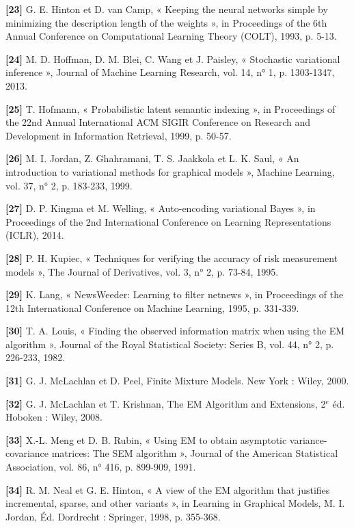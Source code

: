 \textbf{[23]  }G. E. Hinton et D. van Camp, « Keeping the neural networks simple by minimizing the description length of the weights », in Proceedings of the 6th Annual Conference on Computational Learning Theory (COLT), 1993, p. 5-13.

\textbf{[24]  }M. D. Hoffman, D. M. Blei, C. Wang et J. Paisley, « Stochastic variational inference », Journal of Machine Learning Research, vol. 14, n° 1, p. 1303-1347, 2013.

\textbf{[25]  }T. Hofmann, « Probabilistic latent semantic indexing », in Proceedings of the 22nd Annual International ACM SIGIR Conference on Research and Development in Information Retrieval, 1999, p. 50-57.

\textbf{[26]  }M. I. Jordan, Z. Ghahramani, T. S. Jaakkola et L. K. Saul, « An introduction to variational methods for graphical models », Machine Learning, vol. 37, n° 2, p. 183-233, 1999.

\textbf{[27]  }D. P. Kingma et M. Welling, « Auto-encoding variational Bayes », in Proceedings of the 2nd International Conference on Learning Representations (ICLR), 2014.

\textbf{[28]  }P. H. Kupiec, « Techniques for verifying the accuracy of risk measurement models », The Journal of Derivatives, vol. 3, n° 2, p. 73-84, 1995.

\textbf{[29]  }K. Lang, « NewsWeeder: Learning to filter netnews », in Proceedings of the 12th International Conference on Machine Learning, 1995, p. 331-339.

\textbf{[30]  }T. A. Louis, « Finding the observed information matrix when using the EM algorithm », Journal of the Royal Statistical Society: Series B, vol. 44, n° 2, p. 226-233, 1982.

\textbf{[31]  }G. J. McLachlan et D. Peel, Finite Mixture Models. New York : Wiley, 2000.

\textbf{[32]  }G. J. McLachlan et T. Krishnan, The EM Algorithm and Extensions, 2$^{e}$ éd. Hoboken : Wiley, 2008.

\textbf{[33]  }X.-L. Meng et D. B. Rubin, « Using EM to obtain asymptotic variance-covariance matrices: The SEM algorithm », Journal of the American Statistical Association, vol. 86, n° 416, p. 899-909, 1991.

\textbf{[34]  }R. M. Neal et G. E. Hinton, « A view of the EM algorithm that justifies incremental, sparse, and other variants », in Learning in Graphical Models, M. I. Jordan, Éd. Dordrecht : Springer, 1998, p. 355-368.

